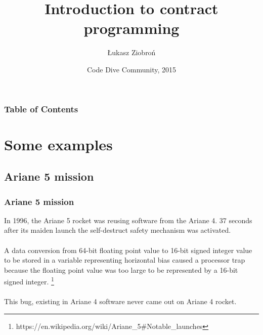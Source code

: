 \documentclass{beamer}
\title[Crisis]{Introduction to contract programming}
\author{Łukasz Ziobroń}
\institute{Nokia}
\date{Code Dive Community, 2015}
\begin{document}
\begin{frame}
\titlepage
\end{frame}

\begin{frame}
\frametitle{Table of Contents}
\begin{multicols}{2}
\tableofcontents
\end{multicols}
\end{frame}


\section{Some examples}
\subsection{Ariane 5 mission}
\begin{frame}
\frametitle{Ariane 5 mission}
{
  In 1996, the Ariane 5 rocket was reusing software from the Ariane 4. 37 seconds after its maiden launch the self-destruct safety mechanism was activated. \\~\\
  A data conversion from 64-bit floating point value to 16-bit signed integer value to be stored in a variable representing horizontal bias caused a processor trap because the floating point value was too large to be represented by a 16-bit signed integer. \footnote{https://en.wikipedia.org/wiki/Ariane\_5\#Notable\_launches} \\~\\
  This bug, existing in Ariane 4 software never came out on Ariane 4 rocket.
}
\end{frame}
\end{document}

